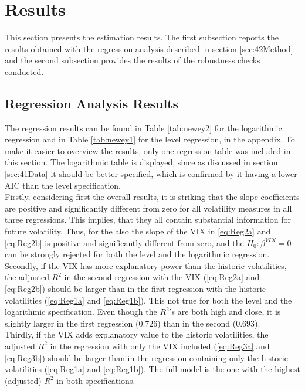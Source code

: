 
\section{Results}\label{sec:5Results}

This section presents the estimation results. The first subsection reports the results obtained with the regression analysis described in section \ref{sec:42Method} and the second subsection provides the results of the robustness checks conducted. 

\subsection{Regression Analysis Results}\label{sec:51Regression}
The regression results can be found in Table \ref{tab:newey2} for the logarithmic regression and in Table \ref{tab:newey1} for the level regression, in the appendix. To make it easier to overview the results, only one regression table was included in this section. The logarithmic table is displayed, since as discussed in section \ref{sec:41Data} it should be better specified, which is confirmed by it having a lower AIC than the level specification.\\
Firstly, considering first the overall results, it is striking that the slope coefficients are positive and significantly different from zero for all volatility measures in all three regressions. This implies, that they all contain substantial information for future volatility. Thus, for the also the slope of the VIX in \ref{eq:Reg2a} and \ref{eq:Reg2b} is positive and significantly different from zero, and the $H_{0}: \beta^{VIX} = 0$ can be strongly rejected for both the level and the logarithmic regression.\\
Secondly, if the VIX has more explanatory power than the historic volatilities, the adjusted $R^{2}$ in the second regression with the \ac{VIX} (\ref{eq:Reg2a} and \ref{eq:Reg2b}) should be larger than in the first regression with the historic volatilities (\ref{eq:Reg1a} and \ref{eq:Reg1b}). This not true for both the level and the logarithmic specification. Even though the $R^{2}$'s are both high and close, it is slightly larger in the first regression ($0.726$) than in the second ($0.693$).\\
Thirdly, if the VIX adds explanatory value to the historic volatilities, the adjusted $R^{2}$ in the regression with only the VIX included (\ref{eq:Reg3a} and \ref{eq:Reg3b}) should be larger than in the regression containing only the historic volatilities (\ref{eq:Reg1a} and \ref{eq:Reg1b}). The full model is the one with the highest (adjusted) $R^{2}$ in both specifications. \\
